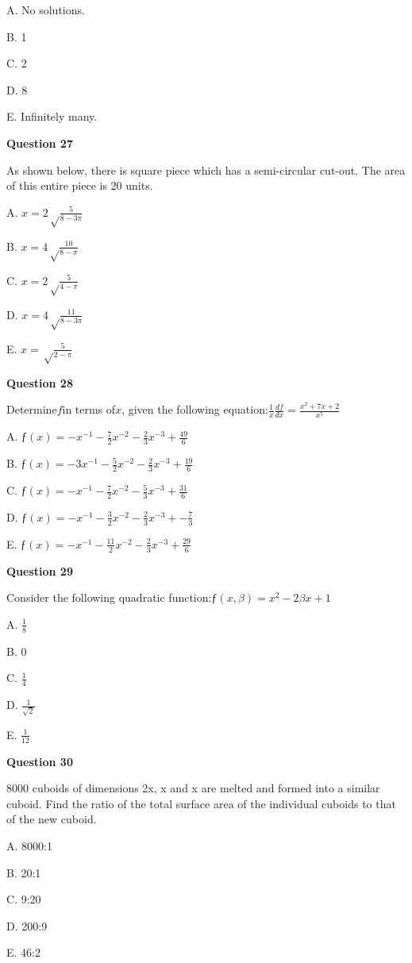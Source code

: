 A. No solutions.

B. 1

C. 2

D. 8

E. Infinitely many.


\textbf{Question 27}

As shown below, there is square piece which has a semi-circular cut-out. The area of this entire piece is 20 units.

A. \(x=2\sqrt\frac{5}{8-3\pi}\)

B. \(x=4\sqrt\frac{10}{8-\pi}\)

C. \(x=2\sqrt\frac{5}{4-\pi}\)

D. \(x=4\sqrt\frac{11}{8-3\pi}\)

E. \(x=\sqrt\frac{5}{2-\pi}\)


\textbf{Question 28}

Determine\(f\)in terms of\(x\), given the following equation:\(\frac{1}{x}\frac{df}{dx}=\frac{x^2+7x+2}{x^5}\)

A. \(ƒ(x)=-x^{-1}-\frac{7}{2}x^{-2}-\frac{2}{3}x^{-3}+\frac{49}{6}\)

B. \(ƒ(x)=-3x^{-1}-\frac{5}{2}x^{-2}-\frac{2}{3}x^{-3}+\frac{19}{6}\)

C. \(ƒ(x)=-x^{-1}-\frac{7}{2}x^{-2}-\frac{5}{3}x^{-3}+\frac{31}{6}\)

D. \(ƒ(x)=-x^{-1}-\frac{3}{2}x^{-2}-\frac{2}{3}x^{-3}+-\frac{7}{3}\)

E. \(ƒ(x)=-x^{-1}-\frac{11}{2}x^{-2}-\frac{2}{3}x^{-3}+\frac{29}{6}\)


\textbf{Question 29}

Consider the following quadratic function:\(ƒ(x,\beta)=x^2-2\beta x+1\)

A. \(\frac{1}{8}\)

B. \(0\)

C. \(\frac{1}{4}\)

D. \(\frac{1}{\sqrt2}\)

E. \(\frac{1}{12}\)


\textbf{Question 30}

8000 cuboids of dimensions 2x, x and x are melted and formed into a similar cuboid. Find the ratio of the total surface area of the individual cuboids to that of the new cuboid.

A. 8000:1

B. 20:1

C. 9:20

D. 200:9

E. 46:2


